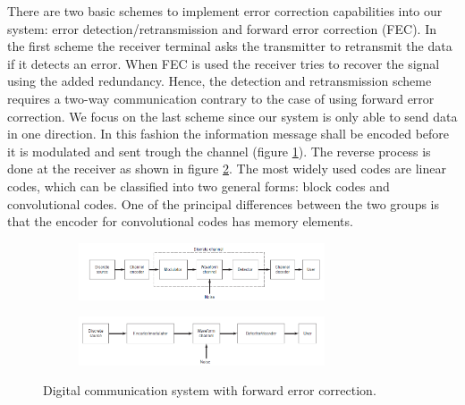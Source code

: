 \documentclass[12pt,a4paper,openright]{report}
\begin{document}
 There are two basic schemes to implement error correction capabilities into our system: error detection/retransmission and forward error correction (FEC)\cite{SklarBook}. In the first scheme the receiver terminal asks the transmitter to retransmit the data if it detects an error. When FEC is used the receiver tries to recover the signal using the added redundancy. Hence, the detection and retransmission scheme requires a two-way communication contrary to the case of using forward error correction. We focus on the last scheme since our system is only able to send data in one direction. In this fashion the information message shall be encoded before it is modulated and sent trough the channel (figure \ref{fig:ChanCodTX}). The reverse process is done at the receiver as shown in figure \ref{fig:ChanCodRX}. The most widely used codes are linear codes, which can be classified into two general forms: block codes and convolutional codes. One of the principal differences between the two groups is that the encoder for convolutional codes has memory elements.
 
  \begin{figure}[H]
  \centering
 	\begin{subfigure}[H]{1\textwidth}
  \centering
     \includegraphics[width=0.8\textwidth]{chancodtx.PNG}
     \label{fig:ChanCodTX}
 
 	\end{subfigure}
 	\quad
 
 	\begin{subfigure}[H]{1\textwidth}
  	\centering
	     \includegraphics[width=0.8\textwidth]{chancodrx.PNG}
     \label{fig:ChanCodRX}
  	\end{subfigure}
     \caption[Digital communication system with forward error correction]{Digital communication system with forward error correction\cite{HaykinBook}.}
     \label{fig:ChanCoding}
 \end{figure}
 
\end{document}
